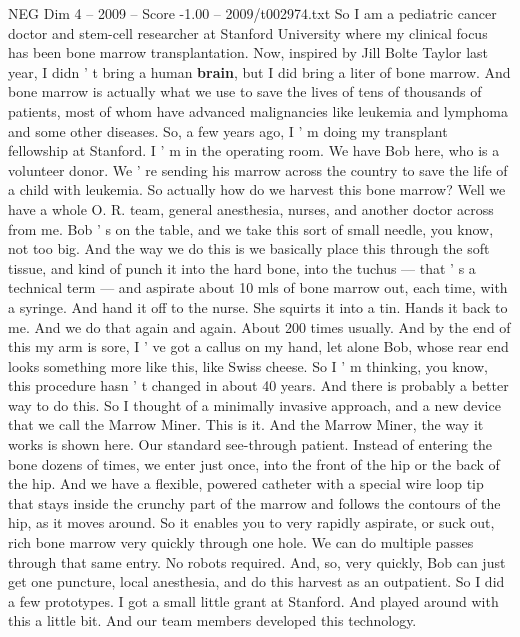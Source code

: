 \begin{textsample}{NEG Dim 4 – 2009 – Score -1.00 – 2009/t002974.txt}  \label{ex:f4_neg_036}
So I am a pediatric cancer doctor and stem-cell researcher at Stanford University where my clinical focus has been bone marrow transplantation.
Now, inspired by Jill Bolte Taylor last year, I didn ' t bring a human \textbf{brain}, but I did bring a liter of bone marrow.
And bone marrow is actually what we use to save the lives of tens of thousands of patients, most of whom have advanced malignancies like leukemia and lymphoma and some other diseases.
So, a few years ago, I ' m doing my transplant fellowship at Stanford.
I ' m in the operating room.
We have Bob here, who is a volunteer donor.
We ' re sending his marrow across the country to save the life of a child with leukemia.
So actually how do we harvest this bone marrow?
Well we have a whole O.
R. team, general anesthesia, nurses, and another doctor across from me.
Bob ' s on the table, and we take this sort of small needle, you know, not too big.
And the way we do this is we basically place this through the soft tissue, and kind of punch it into the hard bone, into the tuchus — that ' s a technical term — and aspirate about 10 mls of bone marrow out, each time, with a syringe.
And hand it off to the nurse.
She squirts it into a tin.
Hands it back to me.
And we do that again and again.
About 200 times usually.
And by the end of this my arm is sore, I ' ve got a callus on my hand, let alone Bob, whose rear end looks something more like this, like Swiss cheese.
So I ' m thinking, you know, this procedure hasn ' t changed in about 40 years.
And there is probably a better way to do this.
So I thought of a minimally invasive approach, and a new device that we call the Marrow Miner.
This is it.
And the Marrow Miner, the way it works is shown here.
Our standard see-through patient.
Instead of entering the bone dozens of times, we enter just once, into the front of the hip or the back of the hip.
And we have a flexible, powered catheter with a special wire loop tip that stays inside the crunchy part of the marrow and follows the contours of the hip, as it moves around.
So it enables you to very rapidly aspirate, or suck out, rich bone marrow very quickly through one hole.
We can do multiple passes through that same entry.
No robots required.
And, so, very quickly, Bob can just get one puncture, local anesthesia, and do this harvest as an outpatient.
So I did a few prototypes.
I got a small little grant at Stanford.
And played around with this a little bit.
And our team members developed this technology.

\end{textsample}
